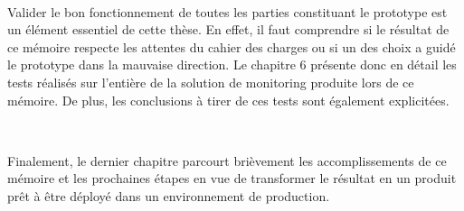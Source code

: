 ~

\noindent
Valider le bon fonctionnement de toutes les parties constituant le prototype est un élément essentiel de cette thèse. En effet, il faut comprendre si le résultat de ce mémoire respecte les attentes du cahier des charges ou si un des choix a guidé le prototype dans la mauvaise direction. Le chapitre 6 présente donc en détail les tests réalisés sur l’entière de la solution de monitoring produite lors de ce mémoire. De plus, les conclusions à tirer de ces tests sont également explicitées.

~

\noindent
Finalement, le dernier chapitre parcourt brièvement les accomplissements de ce mémoire et les prochaines étapes en vue de transformer le résultat en un produit prêt à être déployé dans un environnement de production.
